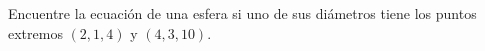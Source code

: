 \item Encuentre la ecuación de una esfera si uno de sus diámetros tiene los puntos extremos $(2, 1, 4)$ y $(4, 3, 10)$.
